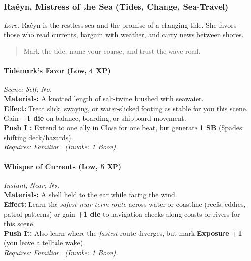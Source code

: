 
\subsubsection{Raéyn, Mistress of the Sea (Tides, Change, Sea-Travel)}
\textit{Lore.} Raéyn is the restless sea and the promise of a changing tide. She favors those who read currents, bargain with weather, and carry news between shores.

\begin{quote}
Mark the tide, name your course, and trust the wave-road.
\end{quote}

\paragraph{Tidemark's Favor (Low, 4 XP)} \emph{Scene; Self; No.}\\
\textbf{Materials:} A knotted length of salt-twine brushed with seawater.\\
\textbf{Effect:} Treat slick, swaying, or water-slicked footing as stable for you this scene. Gain \textbf{+1 die} on balance, boarding, or shipboard movement.\\
\textbf{Push It:} Extend to one ally in Close for one beat, but generate \textbf{1 SB} (Spades: shifting deck/hazards).\\
\emph{Requires: Familiar \ (\textit{Invoke:} 1 Boon).}

\paragraph{Whisper of Currents (Low, 5 XP)} \emph{Instant; Near; No.}\\
\textbf{Materials:} A shell held to the ear while facing the wind.\\
\textbf{Effect:} Learn the \emph{safest near-term route} across water or coastline (reefs, eddies, patrol patterns) or gain \textbf{+1 die} to navigation checks along coasts or rivers for this scene.\\
\textbf{Push It:} Also learn where the \emph{fastest} route diverges, but mark \textbf{Exposure +1} (you leave a telltale wake).\\
\emph{Requires: Familiar \ (\textit{Invoke:} 1 Boon).}

